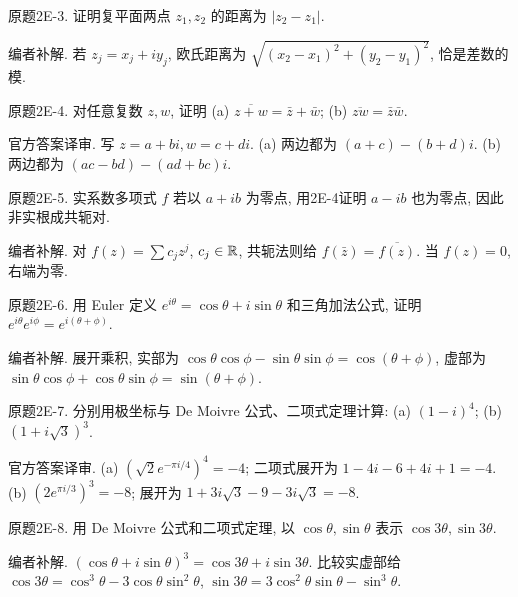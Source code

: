 \begin{exercise}\label{cw:bank-2E-3}
原题2E-3. 证明复平面两点 $z_1,z_2$ 的距离为 $|z_2-z_1|$.
\end{exercise}
\begin{solution}
编者补解. 若 $z_j=x_j+iy_j$, 欧氏距离为 $\sqrt{(x_2-x_1)^2+(y_2-y_1)^2}$, 恰是差数的模.
\end{solution}
\begin{exercise}\label{cw:bank-2E-4}
原题2E-4. 对任意复数 $z,w$, 证明 (a) $\overline{z+w}=\bar z+\bar w$; (b) $\overline{zw}=\bar z\bar w$.
\end{exercise}
\begin{solution}
官方答案译审. 写 $z=a+bi,w=c+di$. (a) 两边都为 $(a+c)-(b+d)i$. (b) 两边都为 $(ac-bd)-(ad+bc)i$.
\end{solution}
\begin{exercise}\label{cw:bank-2E-5}
原题2E-5. 实系数多项式 $f$ 若以 $a+ib$ 为零点, 用2E-4证明 $a-ib$ 也为零点, 因此非实根成共轭对.
\end{exercise}
\begin{solution}
编者补解. 对 $f(z)=\sum c_jz^j$, $c_j\in\mathbb R$, 共轭法则给 $f(\bar z)=\overline{f(z)}$. 当 $f(z)=0$, 右端为零.
\end{solution}
\begin{exercise}\label{cw:bank-2E-6}
原题2E-6. 用 Euler 定义 $e^{i\theta}=\cos\theta+i\sin\theta$ 和三角加法公式, 证明 $e^{i\theta}e^{i\phi}=e^{i(\theta+\phi)}$.
\end{exercise}
\begin{solution}
编者补解. 展开乘积, 实部为 $\cos\theta\cos\phi-\sin\theta\sin\phi=\cos(\theta+\phi)$, 虚部为 $\sin\theta\cos\phi+\cos\theta\sin\phi=\sin(\theta+\phi)$.
\end{solution}
\begin{exercise}\label{cw:bank-2E-7}
原题2E-7. 分别用极坐标与 De Moivre 公式、二项式定理计算: (a) $(1-i)^4$; (b) $(1+i\sqrt3)^3$.
\end{exercise}
\begin{solution}
官方答案译审. (a) $(\sqrt2e^{-\pi i/4})^4=-4$; 二项式展开为 $1-4i-6+4i+1=-4$. (b) $(2e^{\pi i/3})^3=-8$; 展开为 $1+3i\sqrt3-9-3i\sqrt3=-8$.
\end{solution}
\begin{exercise}\label{cw:bank-2E-8}
原题2E-8. 用 De Moivre 公式和二项式定理, 以 $\cos\theta,\sin\theta$ 表示 $\cos3\theta,\sin3\theta$.
\end{exercise}
\begin{solution}
编者补解. $(\cos\theta+i\sin\theta)^3=\cos3\theta+i\sin3\theta$. 比较实虚部给 $\cos3\theta=\cos^3\theta-3\cos\theta\sin^2\theta$, $\sin3\theta=3\cos^2\theta\sin\theta-\sin^3\theta$.
\end{solution}
